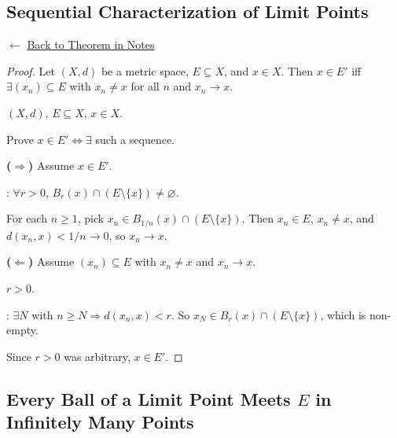 
\subsection*{Sequential Characterization of Limit Points}
\label{prf:seq-char-limit}

\begin{remark*}[Return]
$\leftarrow$ \hyperref[thm:seq-char-limit]{Back to Theorem in Notes}
\end{remark*}

\begin{proof}
\Claim Let $(X,d)$ be a metric space, $E \subseteq X$, and $x \in X$.
Then $x \in E'$ iff $\exists (x_n) \subseteq E$ with $x_n \neq x$ for all $n$ and $x_n \to x$.

\Given $(X,d)$, $E \subseteq X$, $x \in X$.

\Goal Prove $x \in E' \Longleftrightarrow \exists$ such a sequence.

\medskip
\noindent\textbf{($\Rightarrow$)} Assume $x \in E'$.

: $\forall r > 0$, $B_r(x) \cap (E \setminus \{x\}) \neq \varnothing$.

For each $n \ge 1$, pick $x_n \in B_{1/n}(x) \cap (E \setminus \{x\})$.
Then $x_n \in E$, $x_n \neq x$, and $d(x_n, x) < 1/n \to 0$, so $x_n \to x$.

\medskip
\noindent\textbf{($\Leftarrow$)} Assume $(x_n) \subseteq E$ with $x_n \neq x$ and $x_n \to x$.

\Let $r > 0$.

: $\exists N$ with $n \ge N \Rightarrow d(x_n, x) < r$.
So $x_N \in B_r(x) \cap (E \setminus \{x\})$, which is non-empty.

Since $r > 0$ was arbitrary, $x \in E'$. \AsReq
\end{proof}

\subsection*{Every Ball of a Limit Point Meets $E$ in Infinitely Many Points}
\label{prf:inf-nbhd}

